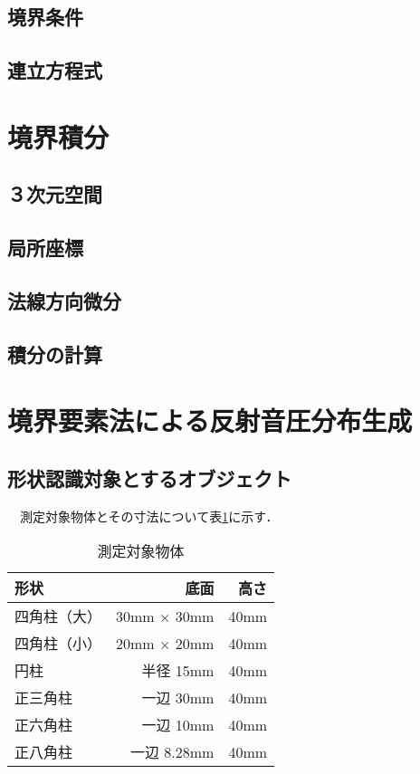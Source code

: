 \subsection{境界条件}

\subsection{連立方程式}



\section{境界積分}

\subsection{３次元空間}

\subsection{局所座標}

\subsection{法線方向微分}

\subsection{積分の計算}


\section{境界要素法による反射音圧分布生成}

\subsection{形状認識対象とするオブジェクト}
　測定対象物体とその寸法について表\ref{table:測定対象物体}に示す．

\begin{table}[htbp]
 \caption{測定対象物体}
 \label{table:測定対象物体}
 \centering
 \begin{tabular}{|l|r|r|}
  \hline
  形状      & 底面            & 高さ \\
  \hline \hline
  四角柱（大） & 30mm × 30mm    & 40mm \\
  \hline
  四角柱（小） & 20mm × 20mm    & 40mm \\
  \hline
  円柱 & 半径 15mm    & 40mm \\
  \hline
  正三角柱   & 一辺 30mm      & 40mm \\
  \hline
  正六角柱   & 一辺 10mm      & 40mm \\
  \hline
  正八角柱   & 一辺 8.28mm      & 40mm \\

  \hline
 \end{tabular}
\end{table}

